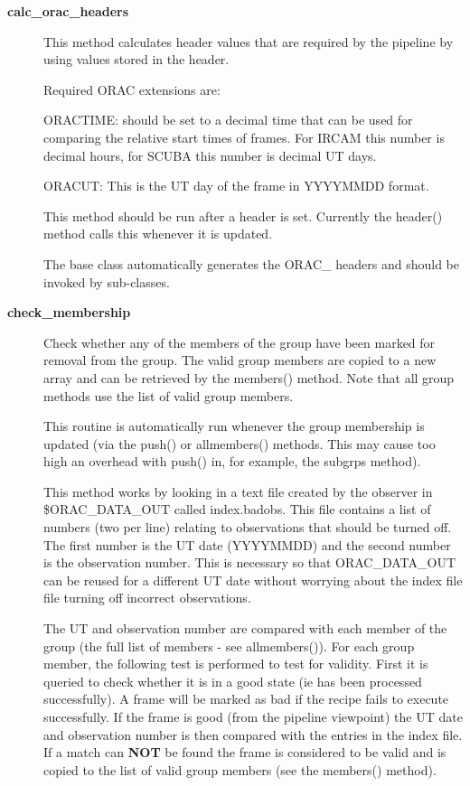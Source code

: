 \begin{description}

\item[\textbf{calc\_orac\_headers}] \mbox{}

This method calculates header values that are required by the
pipeline by using values stored in the header.



Required ORAC extensions are:



ORACTIME: should be set to a decimal time that can be used for
comparing the relative start times of frames. For IRCAM this
number is decimal hours, for SCUBA this number is decimal
UT days.



ORACUT: This is the UT day of the frame in YYYYMMDD format.



This method should be run after a header is set. Currently the header()
method calls this whenever it is updated.



The base class automatically generates the ORAC\_ headers and 
should be invoked by sub-classes.


\item[\textbf{check\_membership}] \mbox{}

Check whether any of the members of the group have been marked for
removal from the group. The valid group members are copied
to a new array and can be retrieved by the members() method.
Note that all group methods use the list of valid group
members.



This routine is automatically run whenever the group membership
is updated (via the push() or  allmembers() methods. This may
cause too high an overhead with push() in, for example, the
subgrps method).



This method works by looking in a text file created by the
observer in \$ORAC\_DATA\_OUT called index.badobs. This file
contains a list of numbers (two per line) relating to observations
that should be turned off. The first number is the UT date
(YYYYMMDD) and the second number is the observation
number. This is necessary so that ORAC\_DATA\_OUT can be reused
for a different UT date without worrying about the index file
file turning off incorrect observations.



The UT and observation number are compared with each member of
the group (the full list of members - see allmembers()).
For each group member, the following test is performed to test
for validity. First it is queried to check whether it is in a
good state (ie has been processed successfully). 
A frame will be marked as bad if the recipe fails to execute
successfully. If the frame is good (from the pipeline viewpoint)
the UT date and observation number is then compared with the
entries in the index file. If a match can \textbf{NOT} be found the
frame is considered to be valid and is copied to the list of valid
group members (see the members() method).




\end{description}
